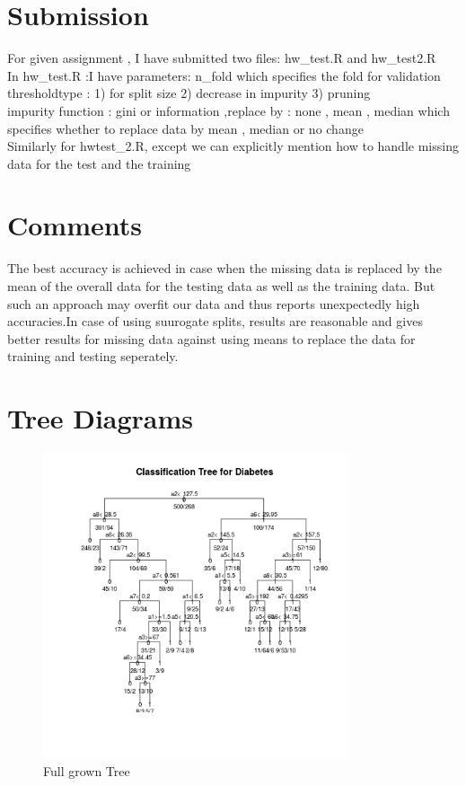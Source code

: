 \documentclass[a4paper]{article}
\begin{document}
\section{Submission}
For given assignment , I have submitted two files: hw\_test.R and hw\_test2.R  \\
In hw\_test.R :I have parameters: n\_fold which specifies the fold for validation  \\
thresholdtype : 1) for split size 2) decrease in impurity 3) pruning \\
impurity function : gini or information ,replace by : none , mean , median which specifies whether to replace data by mean , median or no change  \\
Similarly for hwtest\_2.R, except we can explicitly mention how to handle missing data for the test and the training

\section{Comments}
The best accuracy is achieved in case when the missing data is replaced by the mean of the overall data for the testing data as well as the training data. But such an approach may overfit our data and thus reports unexpectedly high accuracies.In case of using suurogate splits, results are reasonable and gives better results for missing data against using means to replace the data for training and testing seperately.


\section{Tree Diagrams}

\begin{figure}[ht!]
\centering
\includegraphics[width=90mm]{images/tree.png}
\caption{Full grown Tree \label{overflow}}
\end{figure}
\end{document}
